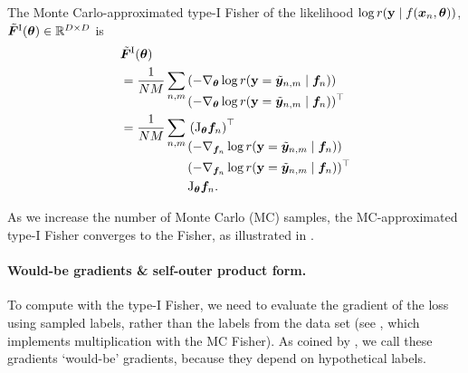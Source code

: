 \begin{definition}\label{def:mc_fisher}%
  The Monte Carlo-approximated type-I Fisher of the likelihood $\log r({\mathbf{y}} \mid f({\bm{x}}_n, {\bm{\theta}}))$,
  $\tilde{{\bm{F}}}^{\text{I}}({\bm{\theta}}) \in {\mathbb{R}}^{D \times D}$ is
  \begin{align*}
    & \tilde{{\bm{F}}}^{\text{I}}({\bm{\theta}}) \\
    & = \frac{1}{NM} \sum_{n,m}
      \begin{aligned}[t]
        & (-\nabla_{{\bm{\theta}}} \log r({\mathbf{y}} = \tilde{{\bm{y}}}_{n,m} \mid {\bm{f}}_n))        \\
        & (-\nabla_{{\bm{\theta}}} \log r({\mathbf{y}} = \tilde{{\bm{y}}}_{n,m} \mid {\bm{f}}_n))^{\top} \\
      \end{aligned} \\
    & = \frac{1}{NM} \sum_{n,m}
      \begin{aligned}[t]
        & \left(\mathrm{J}_{{\bm{\theta}}}{\bm{f}}_n\right)^{\top}                              \\
        & (-\nabla_{{\bm{f}}_n} \log r({\mathbf{y}} = \tilde{{\bm{y}}}_{n,m} \mid {\bm{f}}_n))        \\
        & (-\nabla_{{\bm{f}}_n} \log r({\mathbf{y}} = \tilde{{\bm{y}}}_{n,m} \mid {\bm{f}}_n))^{\top} \\
        & \mathrm{J}_{{\bm{\theta}}}{\bm{f}}_n.
      \end{aligned}
  \end{align*}
\end{definition}
As we increase the number of Monte Carlo (MC) samples, the MC-approximated type-I Fisher converges to the Fisher, as illustrated in .

\paragraph{Would-be gradients \& self-outer product form.}
To compute with the type-I Fisher, we need to evaluate the gradient of the loss using sampled labels, rather than the labels from the data set (see , which implements multiplication with the MC Fisher).
As coined by \citet{papyan2020traces}, we call these gradients `would-be' gradients, because they depend on hypothetical labels.

